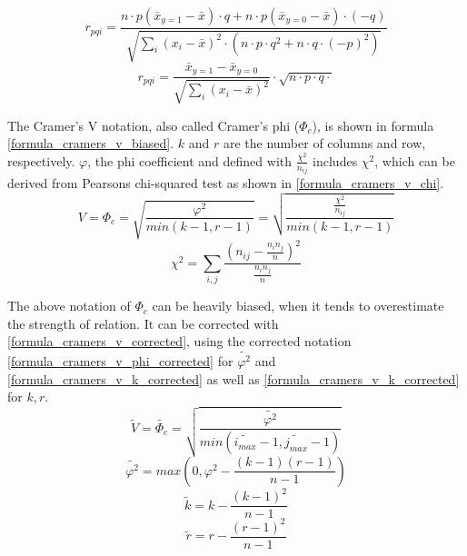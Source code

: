 \documentclass[a4paper,12pt]{report}
\begin{document}
\smallskip

\begin{equation}
\label{formula_point_biserial_from_pearson}
	r_{pqi} =  \frac{n \cdot p (\bar{x}_{y=1}-\bar{x}) \cdot q + n \cdot p (\bar{x}_{y=0}-\bar{x}) \cdot (-q)}{\sqrt{\sum_{i}{(x_i-\bar{x})^2} \cdot (n \cdot p \cdot q^2 + n \cdot q \cdot (-p)^2)}}
\end{equation}
\begin{equation}
\label{formula_point_biserial}
	r_{pqi} =  \frac{\bar{x}_{y=1}-\bar{x}_{y=0}}{\sqrt{\sum_{i}{(x_i-\bar{x})^2}}} \cdot \sqrt{n \cdot p \cdot q \cdot} 
\end{equation}

\bigskip

The Cramer’s V notation, also called Cramer's phi ($\Phi_c$), is shown in formula \ref{formula_cramers_v_biased}. $k$ and $r$ are the number of columns and row, respectively. $\varphi$, the phi coefficient and defined with $\frac{{\chi^2}}{n_{ij}}$ includes $\chi^2$, which can be derived from Pearsons chi-squared test as shown in \ref{formula_cramers_v_chi}. \cite{Sheskin1997,Bergsma2013}
\smallskip
\begin{equation}
\label{formula_cramers_v_biased}
	V = \Phi_c =  \sqrt{\frac{{\varphi^2}}{min(k-1,r-1)}} = \sqrt{\frac{\frac{{\chi^2}}{n_{ij}}}{min(k-1,r-1)}}
\end{equation}
\begin{equation}
\label{formula_cramers_v_chi}
	\chi^2 =  \sum_{i,j}{\frac{(n_{ij}-\frac{n_i n_j}{n})^2}{\frac{n_i n_j}{n}}}
\end{equation}

\smallskip

The above notation of $\Phi_c$ can be heavily biased, when it tends to overestimate the strength of relation. It can be corrected with \ref{formula_cramers_v_corrected}, using the corrected notation \ref{formula_cramers_v_phi_corrected} for $\tilde{\varphi^2}$ and \ref{formula_cramers_v_k_corrected} as well as \ref{formula_cramers_v_k_corrected} for $k,r$. \cite{Bergsma2013}
\smallskip
\begin{equation}
\label{formula_cramers_v_corrected}
	\tilde{V} = \tilde{\Phi_c} = \sqrt{\frac{\tilde{\varphi^2}}{min(\tilde{i_{max}}-1,\tilde{j_{max}}-1)}}
\end{equation}
\begin{equation}
\label{formula_cramers_v_phi_corrected}
	\tilde{\varphi^2} = max(0,\varphi^2 - \frac{(k-1)(r-1)}{n-1})
\end{equation}
\begin{equation}
\label{formula_cramers_v_k_corrected}
	\tilde{k} = k - \frac{(k-1)^2}{n-1}
\end{equation}
\begin{equation}
\label{formula_cramers_v_r_corrected}
	\tilde{r} = r - \frac{(r-1)^2}{n-1}
\end{equation}
\end{document}
